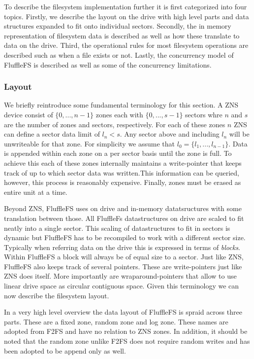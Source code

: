 To describe the filesystem implementation further it is first categorized into
four topics. Firstly, we describe the layout on the drive with high level parts
and data structures expanded to fit onto individual sectors. Secondly, the
in memory representation of filesystem data is described as well as how these
translate to data on the drive. Third, the operational rules for most filesystem
operations are described such as when a file exists or not. Lastly, the
concurrency model of FluffleFS is described as well as some of the concurrency
limitations.

\subsubsection{Layout}

We briefly reintroduce some fundamental terminology for this section. A ZNS
device consist of $\{0,...,n-1\}$ zones each with $\{0,...,s-1\}$ sectors whre
$n$ and $s$ are the number of zones and sectors, respectively. For each of these
zones $n$ ZNS can define a sector data limit of $l_{n} < s$. Any sector above
and including $l_{n}$ will be unwriteable for that zone. For simplicity we
assume that $l_{0} = \{l_{1},...,l_{n-1}\}$. Data is appended within each zone
on a per sector basis until the zone is full. To achieve this each of these
zones internally maintains a write-pointer that keeps track of up to which
sector data was written.This information can be queried, however, this process
is reasonably expensive. Finally, zones must be erased as entire unit at a time.

Beyond ZNS, FluffleFS uses on drive and in-memory datatsructures with some
translation between those. All FluffleFs datastructures on drive are scaled to
fit neatly into a single sector. This scaling of datastructures to fit in
sectors is dynamic but FluffleFS has to be recompiled to work with a different
sector size. Typically when referring data on the drive this is expressed in
terms of \textit{blocks}. Within FluffleFS a block will always be of equal size
to a sector. Just like ZNS, FluffleFS also keeps track of several pointers.
These are write-pointers just like ZNS does itself. More importantly are
wraparound-pointers that allow to use linear drive space as circular contiguous
space. Given this terminology we can now describe the filesystem layout.

In a very high level overview the data layout of FluffleFS is spraid across
three parts. These are a fixed zone, random zone and log zone. These names are
adopted from F2FS and have no relation to ZNS zones. In addition, it should be
noted that the random zone unlike F2FS does not require random writes and has
been adopted to be append only as well.

